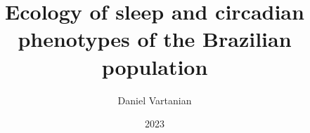 \documentclass[
  12pt,
  a4paper,
  oneside]{tesesusp}
\title{Ecology of sleep and circadian phenotypes of the Brazilian
population}
\author{Daniel Vartanian}
\date{2023}
\begin{document}
\maketitle


\frenchspacing



\clearpage


\imprimircapa


\imprimirfolhaderosto*

%
%  


\begin{errata}
  \noindent
\end{errata}

\end{document}
